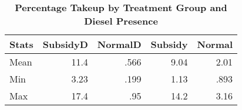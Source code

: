 

\begin{table}[htbp]\centering
\caption{\label{} 
\textbf{Percentage Takeup by Treatment Group and Diesel Presence} }\begin{tabular} {@{} l r r r r @{}} \\ \hline\textbf{   Stats } & \textbf{  SubsidyD} & \textbf{   NormalD} & \textbf{   Subsidy} & \textbf{    Normal} \\
\hline
Mean  & 11.4 & .566 & 9.04 & 2.01 \\
Min  & 3.23 & .199 & 1.13 & .893 \\
Max  & 17.4 & .95 & 14.2 & 3.16 \\
\hline
\end{tabular}
\end{table}



